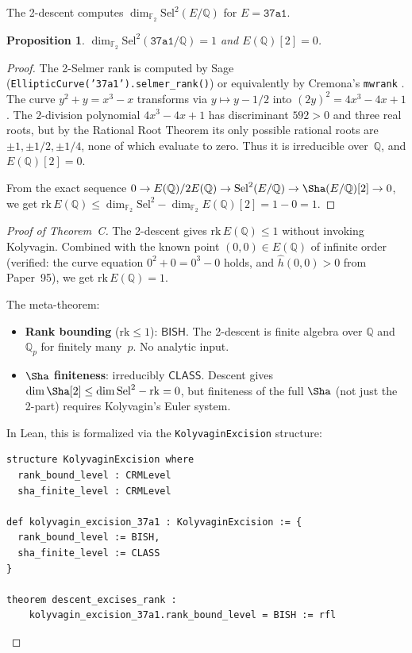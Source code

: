 \documentclass[11pt]{article}
\theoremstyle{plain}
\newtheorem{proposition}[theorem]{Proposition}
\theoremstyle{definition}
\theoremstyle{remark}
\newcommand{\Q}{\mathbb{Q}}
\newcommand{\F}{\mathbb{F}}
\newcommand{\Sel}{\mathrm{Sel}}
\newcommand{\rk}{\mathrm{rk}}
\newcommand{\BISH}{\ensuremath{\mathsf{BISH}}}
\newcommand{\CLASS}{\ensuremath{\mathsf{CLASS}}}
\newcommand{\hhat}{\hat{h}}
\begin{document}
The 2-descent computes $\dim_{\F_2} \Sel^2(E/\Q)$ for $E = \texttt{37a1}$.

\begin{proposition}\label{prop:selmer}
$\dim_{\F_2} \Sel^2(\texttt{37a1}/\Q) = 1$ and $E(\Q)[2] = 0$.
\end{proposition}

\begin{proof}
The 2-Selmer rank is computed by Sage (\texttt{EllipticCurve('37a1').selmer\_rank()}) or equivalently by Cremona's \texttt{mwrank} \cite{cremona}. The curve $y^2 + y = x^3 - x$ transforms via $y \mapsto y - 1/2$ into $(2y)^2 = 4x^3 - 4x + 1$. The $2$-division polynomial $4x^3 - 4x + 1$ has discriminant $592 > 0$ and three real roots, but by the Rational Root Theorem its only possible rational roots are $\pm 1, \pm 1/2, \pm 1/4$, none of which evaluate to zero. Thus it is irreducible over~$\Q$, and $E(\Q)[2] = 0$.

From the exact sequence $0 \to E(\Q)/2E(\Q) \to \Sel^2(E/\Q) \to \Sha(E/\Q)[2] \to 0$, we get $\rk\, E(\Q) \leq \dim_{\F_2} \Sel^2 - \dim_{\F_2} E(\Q)[2] = 1 - 0 = 1$.
\end{proof}

\begin{proof}[Proof of Theorem~C]
The 2-descent gives $\rk\, E(\Q) \leq 1$ without invoking Kolyvagin. Combined with the known point $(0,0) \in E(\Q)$ of infinite order (verified: the curve equation $0^2 + 0 = 0^3 - 0$ holds, and $\hhat(0,0) > 0$ from Paper~95), we get $\rk\, E(\Q) = 1$.

The meta-theorem:
\begin{itemize}[nosep]
\item \textbf{Rank bounding} ($\rk \leq 1$): $\BISH$. The 2-descent is finite algebra over $\Q$ and $\Q_p$ for finitely many~$p$. No analytic input.
\item \textbf{$\Sha$ finiteness}: irreducibly $\CLASS$. Descent gives $\dim \Sha[2] \leq \dim \Sel^2 - \rk = 0$, but finiteness of the full $\Sha$ (not just the 2-part) requires Kolyvagin's Euler system.
\end{itemize}

In Lean, this is formalized via the \texttt{KolyvaginExcision} structure:
\begin{lstlisting}[style=leanstyle]
structure KolyvaginExcision where
  rank_bound_level : CRMLevel
  sha_finite_level : CRMLevel

def kolyvagin_excision_37a1 : KolyvaginExcision := {
  rank_bound_level := BISH,
  sha_finite_level := CLASS
}

theorem descent_excises_rank :
    kolyvagin_excision_37a1.rank_bound_level = BISH := rfl
\end{lstlisting}
\end{proof}
\end{document}
